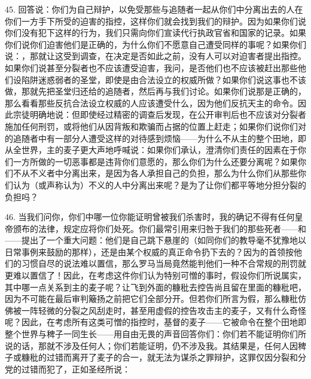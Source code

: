 45. 回答说：你们为自己辩护，以免受那些与追随者一起从你们中分离出去的人在你们一方手下所受的迫害的指控，这样你们就会找到我们的辩护。因为如果你们说你们没有犯下这样的行为，我们只需向你们宣读代行执政官省和国家的记录。如果你们说你们迫害他们是正确的，为什么你们不愿意自己遭受同样的事呢？如果你们说：，那就让这受到调查，在决定是否如此之前，没有人可以对迫害者提出指控。如果你们说甚至分裂者也不应该遭受迫害，我问，是否他们也不应该被赶出那些他们设陷阱迷惑弱者的圣堂，即使是由合法设立的权威所做？如果你们说这事也不该做，那就先把圣堂归还给的追随者，然后再与我们讨论。如果你们说那是正确的，那么看看那些反抗合法设立权威的人应该遭受什么，因为他们反抗天主的命令。因此宗徒明确地说：但即使经过精密的调查后发现，在公开审判后也不应该对分裂者施加任何刑罚，或将他们从因背叛和欺骗而占据的位置上赶走；如果你们说你们对的追随者中有一部分人遭受这样的对待感到烦恼——为什么不从主的整个田地，即从全世界，主的麦子更大声地呼喊说：如果你们承认，澄清你们责任的因素在于你们一方所做的一切恶事都是违背你们意愿的，那么你们为什么还要分离呢？如果你们不从不义者中分离出来，是因为各人承担自己的负担，那么为什么你们从那些你们认为（或声称认为）不义的人中分离出来呢？是为了让你们都平等地分担分裂的负担吗？\par

46. 当我们问你，你们中哪一位你能证明曾被我们杀害时，我的确记不得有任何皇帝颁布的法律，规定应将你们处死。你们最常引用来归咎于我们的那些死者——和——提出了一个重大问题：他们是自己跳下悬崖的（如同你们的教导毫不犹豫地以日常事例来鼓励的那样），还是由某个权威的真正命令扔下去的？因为的首领按他们的习惯自尽的说法难以置信，那么罗马当局竟然能判他们一种不合常规的刑罚就更难以置信了！因此，在考虑这件你们认为特别可憎的事时，假设你们所说属实，其中哪一点关系到主的麦子呢？让飞到外面的糠秕去控告尚且留在里面的糠秕吧，因为不可能在最后审判簸扬之前把它们全部分开。但若你们所言为假，那么糠秕仿佛被一阵轻微的分裂之风刮走时，甚至用虚假的控告攻击主的麦子，又有什么奇怪呢？因此，在考虑所有这类可憎的指控时，基督的麦子——它被命令在整个田地即整个世界与稗子一同生长——用自由无畏的声音回答你们：你们若不能证明你们所说的话，那就不涉及任何人；你们若能证明，仍不涉及我。其结果是，任何人因稗子或糠秕的过错而离开了麦子的合一，就无法为谋杀之罪辩护，这罪仅因分裂和分党的过错而犯了，正如圣经所说：\par

